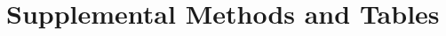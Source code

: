 \documentclass[aps,twocolumn,prl,showpacs,showkeys,preprintnumbers,superscriptaddress,nobibnotes,floatfix,longbibliography,notitlepage,nofootinbib]{revtex4-2}
\begin{document}









\newpage
\onecolumngrid
\appendix

\ifx \standalonesupplemental\undefined
\setcounter{page}{1}
\setcounter{figure}{0}
\setcounter{table}{0}
\setcounter{equation}{0}
\fi

\renewcommand{\thepage}{Supplemental Methods and Tables -- S\arabic{page}}
\renewcommand{\figurename}{SUPPL. FIG.}
\renewcommand{\tablename}{SUPPL. TABLE}

\renewcommand{\theequation}{A\arabic{equation}}

\section{Supplemental Methods and Tables}
\end{document}
